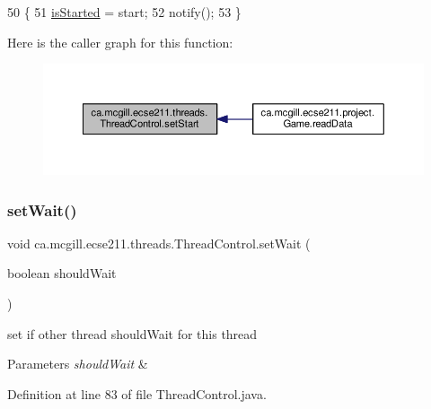 \begin{DoxyCode}
50                                                    \{
51     \hyperlink{classca_1_1mcgill_1_1ecse211_1_1threads_1_1_thread_control_a92f4933511db42476e39956246bcf2fe}{isStarted} = start;
52     notify();
53   \}
\end{DoxyCode}
Here is the caller graph for this function\+:\nopagebreak
\begin{figure}[H]
\begin{center}
\leavevmode
\includegraphics[width=350pt]{classca_1_1mcgill_1_1ecse211_1_1threads_1_1_thread_control_a16221cdc4ccf637b190934549c708e1f_icgraph}
\end{center}
\end{figure}
\mbox{\label{classca_1_1mcgill_1_1ecse211_1_1threads_1_1_thread_control_a7759a6f52b56e15cb37cd25ea31c93c1}} 
\subsubsection{\texorpdfstring{set\+Wait()}{setWait()}}
{\footnotesize\ttfamily void ca.\+mcgill.\+ecse211.\+threads.\+Thread\+Control.\+set\+Wait (\begin{DoxyParamCaption}\item[{boolean}]{should\+Wait }\end{DoxyParamCaption})}

set if other thread should\+Wait for this thread 
\begin{DoxyParams}{Parameters}
{\em should\+Wait} & \\
\hline
\end{DoxyParams}


Definition at line 83 of file Thread\+Control.\+java.


